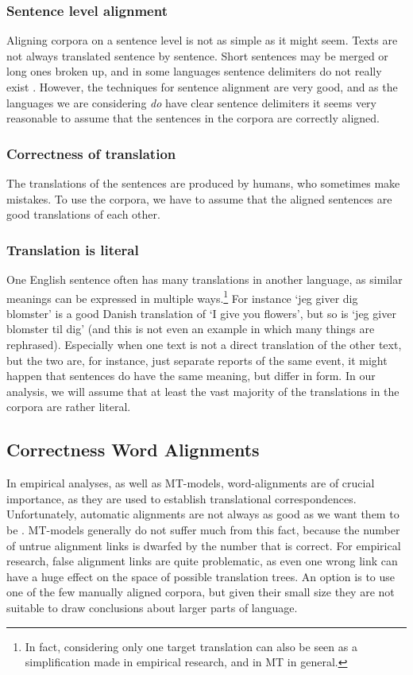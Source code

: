 \subsubsection{Sentence level alignment}
Aligning corpora on a sentence level is not as simple as it might seem. Texts are not always translated sentence by sentence. Short sentences may be merged or long ones broken up, and in some languages sentence delimiters do not really exist \citep[p.55]{koehn2008statistical}. However, the techniques for sentence alignment are very good, and as the languages we are considering \textit{do} have clear sentence delimiters it seems very reasonable to assume that the sentences in the corpora are correctly aligned.

\subsubsection{Correctness of translation}
The translations of the sentences are produced by humans, who sometimes make mistakes. To use the corpora, we have to assume that the aligned sentences are good translations of each other.

\subsubsection{Translation is literal}
One English sentence often has many translations in another language, as similar meanings can be expressed in multiple ways.\footnote{In fact, considering only one target translation can also be seen as a simplification made in empirical research, and in MT in general.} For instance `jeg giver dig blomster' is a good Danish translation of `I give you flowers', but so is `jeg giver blomster til dig' (and this is not even an example in which many things are rephrased). Especially when one text is not a direct translation of the other text, but the two are, for instance, just separate reports of the same event, it might happen that sentences do have the same meaning, but differ in form. In our analysis, we will assume that at least the vast majority of the translations in the corpora are rather literal.
 
\subsection{Correctness Word Alignments}

In empirical analyses, as well as MT-models, word-alignments are of crucial importance, as they are used to establish translational correspondences. Unfortunately, automatic alignments are not always as good as we want them to be \citep[see][for concrete numbers]{och2000improved}. MT-models generally do not suffer much from this fact, because the number of untrue alignment links is dwarfed by the number that is correct. For empirical research, false alignment links are quite problematic, as even one wrong link can have a huge effect on the space of possible translation trees. An option is to use one of the few manually aligned corpora, but given their small size they are not suitable to draw conclusions about larger parts of language.

